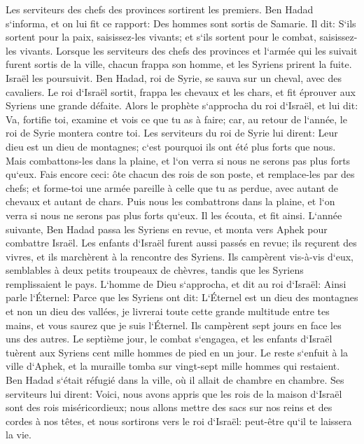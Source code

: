 \verse Les serviteurs des chefs des provinces sortirent les premiers. Ben Hadad s`informa, et on lui fit ce rapport: Des hommes sont sortis de Samarie. 
\verse Il dit: S`ils sortent pour la paix, saisissez-les vivants; et s`ils sortent pour le combat, saisissez-les vivants. 
\verse Lorsque les serviteurs des chefs des provinces et l`armée qui les suivait furent sortis de la ville, 
\verse chacun frappa son homme, et les Syriens prirent la fuite. Israël les poursuivit. Ben Hadad, roi de Syrie, se sauva sur un cheval, avec des cavaliers. 
\verse Le roi d`Israël sortit, frappa les chevaux et les chars, et fit éprouver aux Syriens une grande défaite. 
\verse Alors le prophète s`approcha du roi d`Israël, et lui dit: Va, fortifie toi, examine et vois ce que tu as à faire; car, au retour de l`année, le roi de Syrie montera contre toi. 
\verse Les serviteurs du roi de Syrie lui dirent: Leur dieu est un dieu de montagnes; c`est pourquoi ils ont été plus forts que nous. Mais combattons-les dans la plaine, et l`on verra si nous ne serons pas plus forts qu`eux. 
\verse Fais encore ceci: ôte chacun des rois de son poste, et remplace-les par des chefs; 
\verse et forme-toi une armée pareille à celle que tu as perdue, avec autant de chevaux et autant de chars. Puis nous les combattrons dans la plaine, et l`on verra si nous ne serons pas plus forts qu`eux. Il les écouta, et fit ainsi. 
\verse L`année suivante, Ben Hadad passa les Syriens en revue, et monta vers Aphek pour combattre Israël. 
\verse Les enfants d`Israël furent aussi passés en revue; ils reçurent des vivres, et ils marchèrent à la rencontre des Syriens. Ils campèrent vis-à-vis d`eux, semblables à deux petits troupeaux de chèvres, tandis que les Syriens remplissaient le pays. 
\verse L`homme de Dieu s`approcha, et dit au roi d`Israël: Ainsi parle l`Éternel: Parce que les Syriens ont dit: L`Éternel est un dieu des montagnes et non un dieu des vallées, je livrerai toute cette grande multitude entre tes mains, et vous saurez que je suis l`Éternel. 
\verse Ils campèrent sept jours en face les uns des autres. Le septième jour, le combat s`engagea, et les enfants d`Israël tuèrent aux Syriens cent mille hommes de pied en un jour. 
\verse Le reste s`enfuit à la ville d`Aphek, et la muraille tomba sur vingt-sept mille hommes qui restaient. Ben Hadad s`était réfugié dans la ville, où il allait de chambre en chambre. 
\verse Ses serviteurs lui dirent: Voici, nous avons appris que les rois de la maison d`Israël sont des rois miséricordieux; nous allons mettre des sacs sur nos reins et des cordes à nos têtes, et nous sortirons vers le roi d`Israël: peut-être qu`il te laissera la vie. 
